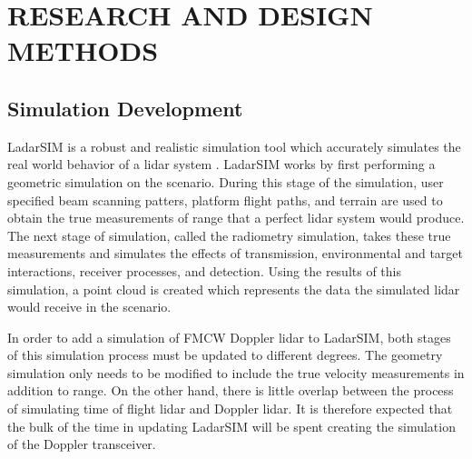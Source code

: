 %
%
%
%

\chapter{RESEARCH AND DESIGN METHODS}

\section{Simulation Development}
LadarSIM is a robust and realistic simulation tool which accurately simulates
the real world behavior of a lidar system \cite{budgeLeishman,neilsenBudge}.
LadarSIM works by first performing a geometric simulation on the scenario. 
During this stage of the simulation, user specified beam scanning patters,
platform flight paths, and terrain are used to obtain the true measurements
of range that a perfect lidar system would produce.
The next stage of simulation, called the radiometry simulation, takes these
true measurements and simulates the effects of transmission, environmental and 
target interactions, receiver processes, and detection. Using the results of 
this simulation, a point cloud is created which represents the data the simulated
lidar would receive in the scenario. 

In order to add a simulation of FMCW Doppler lidar to LadarSIM, both
stages of this simulation process must be updated to different degrees. The 
geometry simulation only needs to be modified to include the true velocity
measurements in addition to range. On the other hand, there is little overlap 
between the process of simulating time of flight lidar and Doppler lidar. It is
therefore expected that the bulk of the time in updating LadarSIM will be spent
creating the simulation of the Doppler transceiver. 
